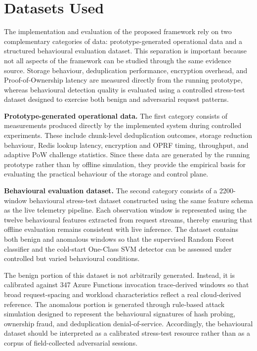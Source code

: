 \documentclass[12pt,a4paper,oneside]{report}
\begin{document}
\section{Datasets Used}

The implementation and evaluation of the proposed framework rely on two complementary categories of data: prototype-generated operational data and a structured behavioural evaluation dataset. This separation is important because not all aspects of the framework can be studied through the same evidence source. Storage behaviour, deduplication performance, encryption overhead, and Proof-of-Ownership latency are measured directly from the running prototype, whereas behavioural detection quality is evaluated using a controlled stress-test dataset designed to exercise both benign and adversarial request patterns.

\textbf{Prototype-generated operational data.}
The first category consists of measurements produced directly by the implemented system during controlled experiments. These include chunk-level deduplication outcomes, storage reduction behaviour, Redis lookup latency, encryption and OPRF timing, throughput, and adaptive PoW challenge statistics. Since these data are generated by the running prototype rather than by offline simulation, they provide the empirical basis for evaluating the practical behaviour of the storage and control plane.

\textbf{Behavioural evaluation dataset.}
The second category consists of a 2200-window behavioural stress-test dataset constructed using the same feature schema as the live telemetry pipeline. Each observation window is represented using the twelve behavioural features extracted from request streams, thereby ensuring that offline evaluation remains consistent with live inference. The dataset contains both benign and anomalous windows so that the supervised Random Forest classifier and the cold-start One-Class SVM detector can be assessed under controlled but varied behavioural conditions.

The benign portion of this dataset is not arbitrarily generated. Instead, it is calibrated against 347 Azure Functions invocation trace-derived windows so that broad request-spacing and workload characteristics reflect a real cloud-derived reference. The anomalous portion is generated through rule-based attack simulation designed to represent the behavioural signatures of hash probing, ownership fraud, and deduplication denial-of-service. Accordingly, the behavioural dataset should be interpreted as a calibrated stress-test resource rather than as a corpus of field-collected adversarial sessions.
\end{document}
